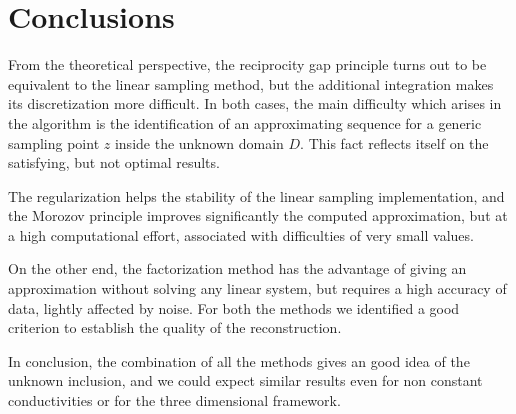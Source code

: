 \documentclass[10pt, a4paper, twoside, openright]{book}
\theoremstyle{definition}
\theoremstyle{plain}
\theoremstyle{plain}
\theoremstyle{plain}
\theoremstyle{plain}
\theoremstyle{plain}
\theoremstyle{plain}
\theoremstyle{plain}
\theoremstyle{plain}
\begin{document}
\clearpage

% 

\chapter*{Conclusions}
From the theoretical perspective, the reciprocity gap principle turns out to be equivalent to the linear sampling method, 
but the additional integration makes its discretization more difficult.
In both cases, the main difficulty which arises in the algorithm is the 
identification of an approximating
sequence for a generic sampling point $z$ inside the unknown domain $D$. 
This fact reflects itself 
on the 
satisfying,
but not optimal results.
\par
The regularization helps the stability of the linear sampling implementation, and 
the Morozov principle improves significantly the computed approximation, but at a high 
computational effort, associated with difficulties of very small values.
\par
On the other end, the factorization method has the advantage of giving an approximation 
without solving any linear system, but requires a high accuracy of data, lightly affected 
by noise.
For both the methods we identified a good criterion to establish the quality of the
reconstruction.
\par
In conclusion, the combination of all the methods gives an good idea of the unknown 
inclusion, and we could expect similar results even for non constant conductivities
or for the three dimensional framework.

\printbibliography              %
\end{document}
